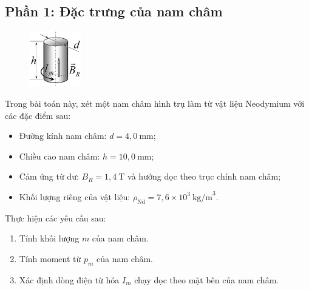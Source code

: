 \subsection*{Phần 1: Đặc trưng của nam châm}
\begin{figure}
  \centering
  \vspace{-0.55cm}
  \includegraphics[width=0.2\textwidth]{Figures/Problems/Fig 2.4.png}
\end{figure}

\noindent Trong bài toán này, xét một nam châm hình trụ làm từ vật liệu Neodymium với các đặc điểm sau:
\begin{itemize}
  \item Đường kính nam châm: $d = 4{,}0~\text{mm}$;
  \item Chiều cao nam châm: $h = 10{,}0~\text{mm}$;
  \item Cảm ứng từ dư: $B_R = 1{,}4~\text{T}$ và hướng dọc theo trục chính nam châm;
  \item Khối lượng riêng của vật liệu: $\rho_{\text{Nd}} = 7{,}6 \times 10^3~\text{kg/m}^3$.
\end{itemize}
Thực hiện các yêu cầu sau:
\begin{enumerate}
  \item Tính khối lượng $m$ của nam châm.
  \item Tính moment từ $p_m$ của nam châm.
  \item Xác định dòng điện từ hóa $I_m$ chạy dọc theo mặt bên của nam châm.
\end{enumerate}


